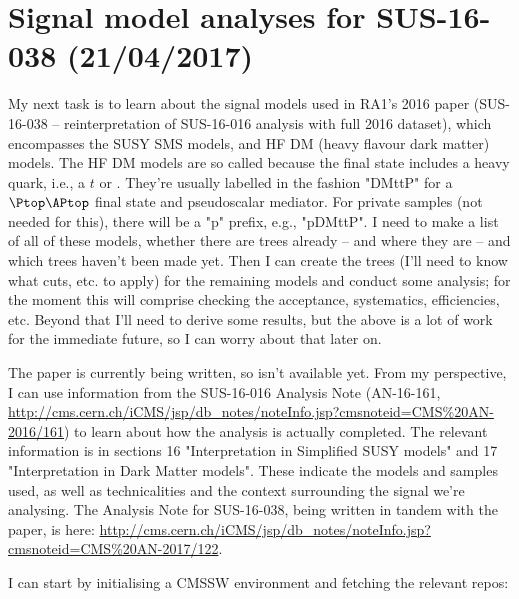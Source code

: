 
\chapter{Signal model analyses for SUS-16-038 (21/04/2017)}

My next task is to learn about the signal models used in RA1's 2016 paper (SUS-16-038 -- reinterpretation of SUS-16-016 analysis with full 2016 dataset), which encompasses the SUSY SMS models, and HF DM (heavy flavour dark matter) models. The HF DM models are so called because the final state includes a heavy quark, i.e., a $t$ or \Pqb. They're usually labelled in the fashion "DMttP" for a $\ttbar$ final state and pseudoscalar mediator. For private samples (not needed for this), there will be a "p" prefix, e.g., "pDMttP". I need to make a list of all of these models, whether there are trees already -- and where they are -- and which trees haven't been made yet. Then I can create the trees (I'll need to know what cuts, etc. to apply) for the remaining models and conduct some analysis; for the moment this will comprise checking the acceptance, systematics, efficiencies, etc. Beyond that I'll need to derive some results, but the above is a lot of work for the immediate future, so I can worry about that later on.

The paper is currently being written, so isn't available yet. From my perspective, I can use information from the SUS-16-016 Analysis Note (AN-16-161, \url{http://cms.cern.ch/iCMS/jsp/db_notes/noteInfo.jsp?cmsnoteid=CMS\%20AN-2016/161}) to learn about how the analysis is actually completed. The relevant information is in sections 16 "Interpretation in Simplified SUSY models" and 17 "Interpretation in Dark Matter models". These indicate the models and samples used, as well as technicalities and the context surrounding the signal we're analysing. The Analysis Note for SUS-16-038, being written in tandem with the paper, is here: \url{http://cms.cern.ch/iCMS/jsp/db_notes/noteInfo.jsp?cmsnoteid=CMS\%20AN-2017/122}. 

I can start by initialising a CMSSW environment and fetching the relevant repos:

